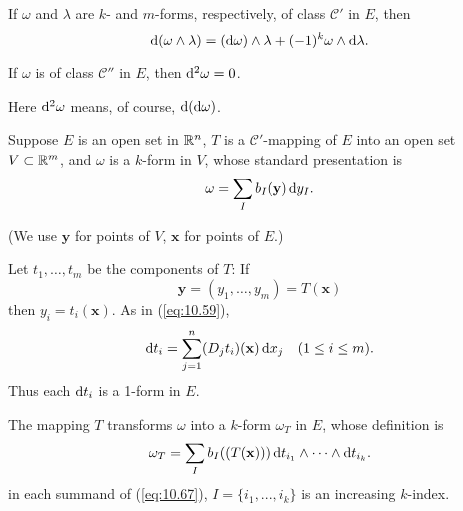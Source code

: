\begin{thm}
    \label{thm:10.20}
    \begin{asparaenum}[(a)]
        \item If $\omega$ and $\lambda$ are $k$- and $m$-forms, respectively, of class $\mathscr{C}'$ in $E$,
        then
        \begin{equation}
            \label{eq:10.63}
            \d (\omega \wedge \lambda) =
            (\d \omega) \wedge \lambda +
            (-1)^k \omega \wedge \d \lambda .
        \end{equation}
        \item If $\omega$ is of class $\mathscr{C}''$ in $E$, then $\d ^2 \omega = 0$.
    \end{asparaenum}
\end{thm}

Here $\d ^2 \omega$ means, of course, $\d (\d \omega)$.


\begin{mydef}
    Suppose $E$ is an open set in ${\protect\mathbb R}^n$,
    $T$ is a $\mathscr{C}'$-mapping of $E$ into an open set $V \subset {\protect\mathbb R}^m$,
    and $\omega$ is a $k$-form in $V$, whose standard presentation is
    \begin{equation}
        \label{eq:10.65}
        \omega = \sum_{I} b_I (\mathbf{y}) \d y_I.
    \end{equation}

    (We use $\mathbf{y}$ for points of $V$, $\mathbf{x}$ for points of $E$.)

    Let $t_1,\dots,t_m$ be the components of $T$: If
    \begin{equation*}
        \mathbf{y} = (y_1, \dots, y_m) = T(\mathbf{x})
    \end{equation*}
    then $y_i = t_i(\mathbf{x})$.
    As in (\ref{eq:10.59}),
    \begin{equation}
        \label{eq:10.66}
        \d t_i = \sum_{j=1}^{n}(D_j t_i)(\mathbf{x}) \d x_j
        \quad (1 \leq i \leq m).
    \end{equation}
    Thus each $\d t_i$ is a 1-form in $E$.

    The mapping $T$ transforms $\omega$ into a $k$-form $\omega_T$ in $E$,
    whose definition is
    \begin{equation}
        \label{eq:10.67}
        \omega_T = \sum_I b_I ((T(\mathbf{x})))
        \d t_{i_1} \wedge \cdots \wedge
        \d t_{i_k} .
    \end{equation}
    in each summand of (\ref{eq:10.67}),
    $I = \{i_1,...,i_k\}$ is an increasing $k$-index.
\end{mydef}

